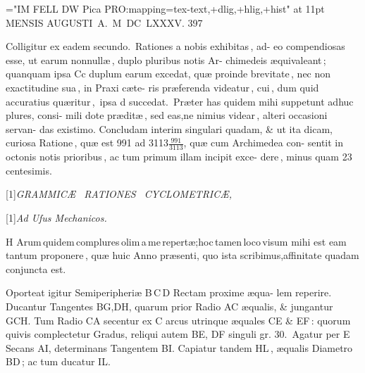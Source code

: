 \documentclass[10pt]{article}
\begin{document}
%

    \font\1="IM FELL DW Pica PRO:mapping=tex-text,+dlig,+hlig,+hist" at 11pt
    \1
\noindent\hfill {\large \,\,\,\,\,MENSIS AUGUSTI\, A.\, M\, DC\, LXXXV. \hfill 
397}\smallskip

Colligitur ex eadem secundo.\, Rationes a nobis exhibitas\,, ad-\linebreak
eo compendiosas esse, ut earum nonnullæ\,, duplo pluribus notis Ar-\linebreak
chimedeis æquivaleant\,; quanquam ipsa Cc duplum earum excedat,\linebreak
quæ proinde brevitate\,, nec non exactitudine sua\,, in Praxi cæte-\linebreak
ris præferenda videatur\,, cui\,, dum quid accuratius quæritur\,,\, ipsa 
d\linebreak
succedat.\, Præter has quidem mihi suppetunt adhuc plures, consi-\linebreak
mili dote præditæ\,, sed eas,ne nimius videar\,, alteri occasioni 
servan-\linebreak
das existimo. Concludam interim singulari quadam, \& ut ita dicam,\linebreak
curiosa Ratione\,, quæ est 991 ad 
3113$\frac{\textrm{991}}{\textrm{3113}}$,
quæ cum Archimedea con-\vspace*{-4pt}\linebreak
sentit in octonis notis prioribus\,, ac tum primum illam incipit exce-\linebreak
dere\,, minus quam 23 centesimis.\medskip

\begin{centering}
\large \scalebox{1.0}[1]{\textit{GRAMMICÆ\,\,\, RATIONES\,\,\, CYCLOMETRICÆ,}}

\large \scalebox{1.0}[1]{\textit{Ad Uſus Mechanicos.}}

\end{centering}
\lettrine[lines=2, loversize=0.33, nindent=0pt]{H}{}%
\hspace*{-2.5pt}Arum\,quidem\,complures\,olim\,a\,me\,repertæ;hoc\,tamen\,loco\,vi\-sum
mihi est eam tantum proponere\,, quæ huic Anno præsenti,\linebreak
quo ista scribimus,affinitate quadam conjuncta est.

Oporteat igitur Semiperipheriæ B\,C\,D Rectam proxime æqua-\linebreak
lem reperire.\, Ducantur Tangentes BG,DH, quarum prior Radio\linebreak
AC æqualis, \& jungantur GCH. Tum Radio CA secentur ex C arcus\linebreak
utrinque æquales CE \& EF\,: quorum quivis complectetur Gradus, reliqui autem BE, DF singuli gr. 30.{\,} Agatur per E Secans\linebreak
AI, determinans Tangentem BI. Capiatur tandem HL\,, æqualis\linebreak
Diametro BD\,; ac tum ducatur IL. \vspace{-0.7\baselineskip}
\end{document}
